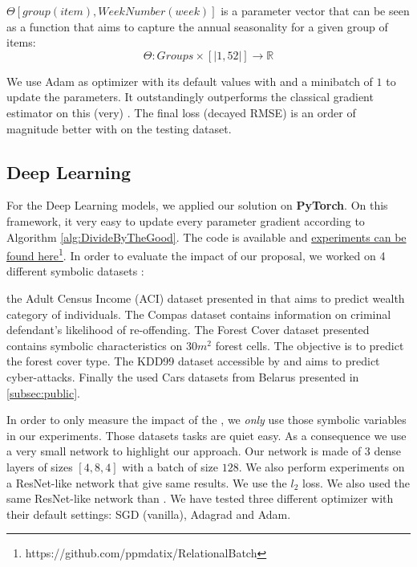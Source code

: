 $\Theta [group(item), WeekNumber(week)]$ is a parameter vector that can be seen as a function that aims to capture the annual seasonality for a given group of items:
\begin{equation*}
    \Theta : Groups \times [| 1, 52|] \longrightarrow \mathbb{R}
\end{equation*}

We use Adam as optimizer with its default values with \tecname and a minibatch of $1$ to update the parameters. It outstandingly outperforms the classical gradient estimator on this (very) \catmod. The final loss (decayed RMSE) is an order of magnitude better with \tecname on the testing dataset.


\subsection{Deep Learning}

For the Deep Learning models, we applied our solution on \textbf{PyTorch}. On this framework, it very easy to update every parameter gradient according to Algorithm \ref{alg:DivideByTheGood}. The code is available and \href{https://github.com/ppmdatix/RelationalBatch}{experiments can be found here}\footnote{https://github.com/ppmdatix/RelationalBatch}.  In order to evaluate the impact of our proposal,  we worked on 4 different symbolic datasets :

the Adult Census Income (ACI) dataset presented in \cite{incomeDataset} that aims to predict wealth category of individuals. The Compas dataset contains information on criminal defendant’s likelihood of re-offending.  The Forest Cover dataset presented \cite{ForestCover} contains symbolic characteristics on $30m^2$ forest cells. The objective is to predict the forest cover type. The KDD99 dataset accessible by \cite{KDD99} and aims to predict cyber-attacks. Finally the used Cars datasets from Belarus presented in \ref{subsec:public}.





In order to only measure the impact of the \tecname, we \textit{only} use those symbolic variables in our experiments. Those datasets tasks are quiet easy. As a consequence we use a very small network to highlight our approach. Our network is made of 3 dense layers of sizes $[4,8,4]$ with a batch of size $128$. We also perform experiments on a ResNet-like network that give same results. We use the $l_2$ loss. We also used the same ResNet-like network than \cite{RevisitingDeepForTabular}.
We have tested three different optimizer with their default settings: SGD (vanilla), Adagrad and Adam.

